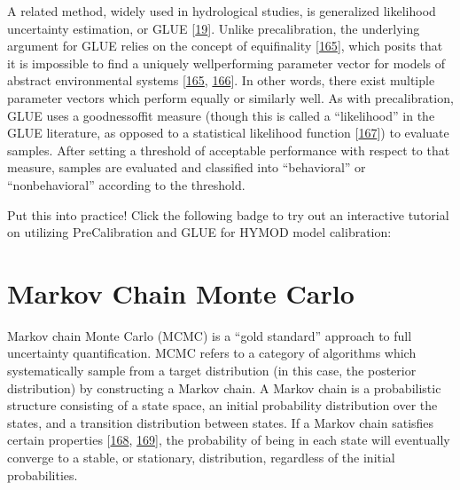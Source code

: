 \documentclass[a4paper,10pt,english]{book}
\begin{document}
\sphinxAtStartPar
A related method, widely used in hydrological studies, is generalized likelihood uncertainty estimation, or GLUE {[}\hyperlink{cite.index:id38}{19}{]}. Unlike pre\sphinxhyphen{}calibration, the underlying argument for GLUE relies on the concept of equifinality {[}\hyperlink{cite.index:id43}{165}{]}, which posits that it is impossible to find a uniquely well\sphinxhyphen{}performing parameter vector for models of abstract environmental systems {[}\hyperlink{cite.index:id43}{165}, \hyperlink{cite.index:id44}{166}{]}. In other words, there exist multiple parameter vectors which perform equally or similarly well. As with pre\sphinxhyphen{}calibration, GLUE uses a goodness\sphinxhyphen{}of\sphinxhyphen{}fit measure (though this is called a “likelihood” in the GLUE literature, as opposed to a statistical likelihood function {[}\hyperlink{cite.index:id45}{167}{]}) to evaluate samples. After setting a threshold of acceptable performance with respect to that measure, samples are evaluated and classified into “behavioral” or “non\sphinxhyphen{}behavioral” according to the threshold.


\nopagebreak


\sphinxAtStartPar
Put this into practice! Click the following badge to try out an interactive tutorial on utilizing Pre\sphinxhyphen{}Calibration and GLUE for HYMOD model calibration:
\begin{quote}

\sphinxAtStartPar
{}
\end{quote}




\section{Markov Chain Monte Carlo}
\label{\detokenize{A1_Uncertainty_Quantification:markov-chain-monte-carlo}}
\sphinxAtStartPar
Markov chain Monte Carlo (MCMC) is a “gold standard” approach to full uncertainty quantification. MCMC refers to a category of algorithms which systematically sample from a target distribution (in this case, the posterior distribution) by constructing a Markov chain. A Markov chain is a probabilistic structure consisting of a state space, an initial probability distribution over the states, and a transition distribution between states. If a Markov chain satisfies certain properties {[}\hyperlink{cite.index:id170}{168}, \hyperlink{cite.index:id169}{169}{]}, the probability of being in each state will eventually converge to a stable, or stationary, distribution, regardless of the initial probabilities.
\end{document}

